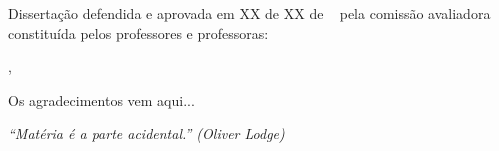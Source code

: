 \documentclass[
	12pt,				%
	openright,			%
	twoside,			%
	a4paper,			%
	english,			%
	brazil				%
	]{abntex2}
\begin{document}

%
% 
%
\begin{folhadeaprovacao}
%
   Dissertação defendida e aprovada em XX de XX de \the\year~ pela comissão avaliadora constituída pelos professores e professoras:
   \vspace*{\fill}
   \vspace*{\fill}
   \vspace*{\fill}
   \vspace*{\fill}

   \begin{center}
    \vspace*{0.5cm}
    {\large\imprimirlocal}, {\large\imprimirdata}
    \vspace*{1cm}
  \end{center}

\end{folhadeaprovacao}


\begin{agradecimentos}
\noindent Os agradecimentos vem aqui...

\end{agradecimentos}

\begin{epigrafe}
    \vspace*{\fill}
	\begin{flushright}
		\textit{``Matéria é a parte acidental.'' (Oliver Lodge)}
	\end{flushright}
\end{epigrafe}
\end{document}
